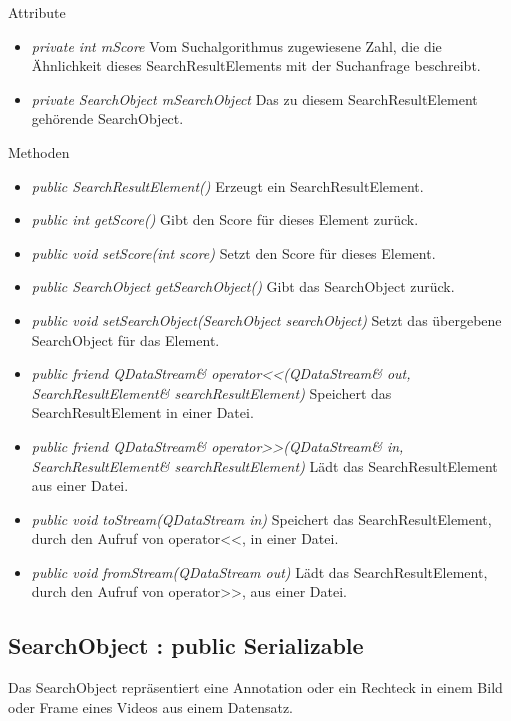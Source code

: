 Attribute
\begin{itemize}
\item\textit{private int mScore} Vom \gls{Suchalgorithmus} zugewiesene Zahl, die die Ähnlichkeit dieses SearchResultElements mit der Suchanfrage beschreibt. 
\item\textit{private SearchObject mSearchObject} Das zu diesem SearchResultElement gehörende SearchObject.
\end{itemize}

Methoden
\begin{itemize}
\item \textit{public SearchResultElement()} Erzeugt ein SearchResultElement.
\item \textit{public int getScore()} Gibt den Score für dieses Element zurück.
\item \textit{public void setScore(int score)} Setzt den Score für dieses Element.
\item \textit{public SearchObject getSearchObject()} Gibt das SearchObject zurück.
\item \textit{public void setSearchObject(SearchObject searchObject)} Setzt das übergebene SearchObject für das Element.
\item \textit{public friend QDataStream\& operator<<(QDataStream\& out, SearchResultElement\& searchResultElement)} Speichert das SearchResultElement in einer Datei.
\item \textit{public friend QDataStream\& operator>>(QDataStream\& in, SearchResultElement\& searchResultElement)} Lädt das SearchResultElement aus einer Datei.
\item \textit{public void toStream(QDataStream in)} Speichert das SearchResultElement, durch den Aufruf von operator<<, in einer Datei.
\item \textit{public void fromStream(QDataStream out)} Lädt das SearchResultElement, durch den Aufruf von operator>>, aus einer Datei.
\end{itemize}

\subsection*{SearchObject : public Serializable}
Das SearchObject repräsentiert eine \gls{Annotation} oder ein Rechteck in einem Bild oder Frame eines Videos aus einem Datensatz.

